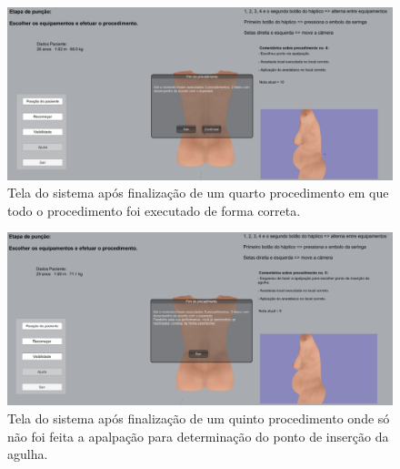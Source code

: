 \begin{figure}[ht!]
    \centering
    \includegraphics[width=\textwidth]{capitulos/figuras/sistema-exemplo-execucao-procedimento-4.png} 
    \caption{Tela do sistema após finalização de um quarto procedimento em que todo o procedimento foi executado de forma correta.}
    \label{fig:sistemaExecucao4correto}
\end{figure}

\begin{figure}[ht!]
    \centering
    \includegraphics[width=\textwidth]{capitulos/figuras/sistema-exemplo-execucao-procedimento-5.png} 
    \caption{Tela do sistema após finalização de um quinto procedimento onde só não foi feita a apalpação para determinação do ponto de inserção da agulha.}
    \label{fig:sistemaExecucao5semApalpacaoCorreto}
\end{figure}